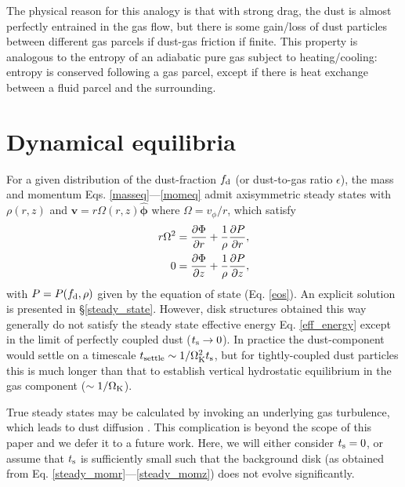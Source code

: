 The physical reason for this analogy is that with strong drag, the dust is almost
perfectly entrained in the gas flow, but there is some gain/loss of 
dust particles between different gas parcels if dust-gas
friction if finite. This property is analogous to the entropy of an adiabatic
pure gas subject to heating/cooling: entropy is conserved following
a gas parcel, except if there is heat exchange between a fluid parcel
and the surrounding.  

\section{Dynamical equilibria}\label{eqm}
 
For a given distribution of the dust-fraction $f_\mathrm{d}$ (or
dust-to-gas ratio $\epsilon$), the 
mass and momentum Eqs. \ref{masseq}---\ref{momeq} admit     
axisymmetric steady states with $\rho(r,z)$ and 
$\bm{v}=r\Omega(r,z)\hat{\bm{\phi}}$ where $\Omega = v_\phi/r$, which satisfy 
\begin{align}
  r\Omega^2 &= \frac{\partial \Phi}{\partial r} + \frac{1}{\rho}\frac{\partial P}{\partial
    r},\label{steady_momr}\\
  0 & = \frac{\partial\Phi}{\partial z} + \frac{1}{\rho}\frac{\partial P}{\partial z},\label{steady_momz}
\end{align}
with $P=P(f_\mathrm{d},\rho)$ given by the equation of state
(Eq. \ref{eos}). An explicit solution is presented in
\S\ref{steady_state}.  
However, disk structures obtained this way generally do not satisfy 
the steady state effective energy Eq. \ref{eff_energy} 
except in the limit of perfectly coupled dust ($t_\mathrm{s}\to0$).  In
practice the dust-component would settle on a timescale
$t_\mathrm{settle}\sim 1/\Omega_{\rm K}^2t_\mathrm{s}$, but for tightly-coupled dust
particles this is much longer than that to establish vertical
hydrostatic equilibrium in the gas component ($\sim 1/\Omega_{\rm K}$).   

True steady states may be calculated by invoking an underlying gas
turbulence, which leads to dust diffusion \citep{takeuchi02, youdin07, 
  lyra13}. This complication is beyond the scope of this paper and we 
defer it to a future work. Here, we will either consider $t_\mathrm{s} = 0$,
or assume that $t_\mathrm{s}$ is sufficiently small such that the background
disk (as obtained from Eq. \ref{steady_momr}---\ref{steady_momz}) does 
not evolve significantly.  %


